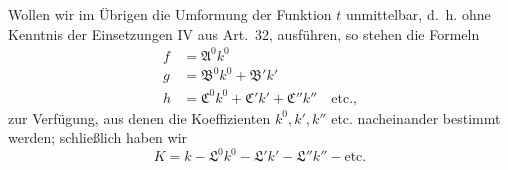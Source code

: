 Wollen wir im Übrigen die Umformung der Funktion \(t\) unmittelbar, d.\ h. ohne Kenntnis der Einsetzungen IV aus Art.\ 32, ausführen, so stehen die Formeln
\[
\begin{aligned}
f&=\mathfrak{A}^0k^0\\
g&=\mathfrak{B}^0k^0+\mathfrak{B}'k'\\
h&=\mathfrak{C}^0k^0+\mathfrak{C}'k'+\mathfrak{C}''k''\quad\text{etc.,}
\end{aligned}
\]
zur Verfügung, aus denen die Koeffizienten \(k^0,k',k''\) etc. nacheinander bestimmt werden; schließlich haben wir
\[
K=k-\mathfrak{L}^0k^0-\mathfrak{L}'k'-\mathfrak{L}''k''-\text{etc.}
\]

\clearpage

